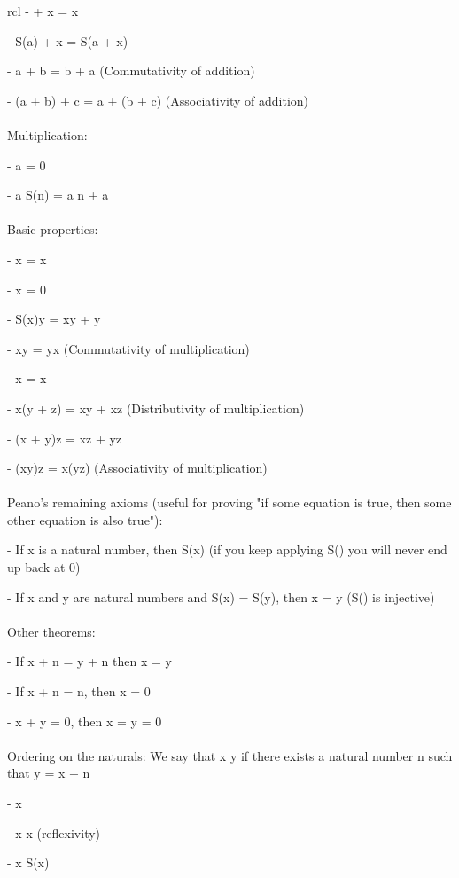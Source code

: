 \documentclass{article}
\begin{document}
\begin{arrary}{rcl}
-  + x = x\)

- \math S(a) + x = S(a + x)\)

- \math a + b = b + a\) (Commutativity of addition)

- \math (a + b) + c = a + (b + c)\) (Associativity of addition)
\\
\\
Multiplication:

- \math a  = 0\)

- \math a \times S(n) = a \times n + a\)
\\
\\
\newline Basic properties:

- \math x  = x\)

-  \times x = 0\)

- \math S(x)y = xy + y\)

- \math xy = yx\) (Commutativity of multiplication)

-  \times x = x\)

- \math x(y + z) = xy + xz\) (Distributivity of multiplication)

- \math (x + y)z = xz + yz\)

- \math (xy)z = x(yz)\) (Associativity of multiplication)
\\
\\
Peano's remaining axioms (useful for proving "if some equation is true, then some other equation is also true"):

- If x is a natural number, then \math S(x) \) (if you keep applying S() you will never end up back at 0)

- If x and y are natural numbers and \math S(x) = S(y)\), then \math x = y\) (\math S()\) is injective)
\\
\\
Other theorems:

- If \math x + n = y + n\) then \math x = y\)

- If \math x + n = n\), then \math x = 0\)

- \math x + y = 0\), then \math x = y = 0\)
\\
\\
Ordering on the naturals: We say that \math x \leq y\) if there exists a natural number n such that \math y = x + n\)

-  \leq x\)

- \math x \leq x\) (reflexivity)

- \math x \leq S(x)\)


\end{arrary}
\end{document}
